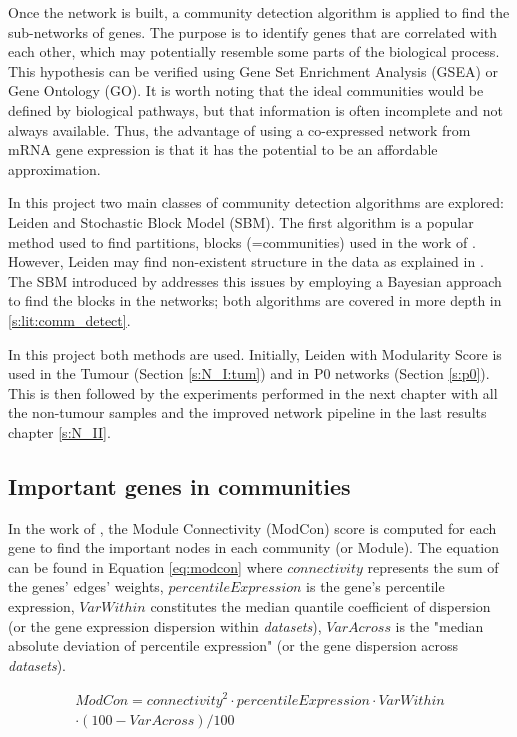 Once the network is built, a community detection algorithm is applied to find the sub-networks of genes. The purpose is to identify genes that are correlated with each other, which may potentially resemble some parts of the biological process. This hypothesis can be verified using Gene Set Enrichment Analysis (GSEA) or Gene Ontology (GO). It is worth noting that the ideal communities would be defined by biological pathways, but that information is often incomplete and not always available. Thus, the advantage of using a co-expressed network from mRNA gene expression is that it has the potential to be an affordable approximation.


In this project two main classes of community detection algorithms are explored: Leiden and Stochastic Block Model (SBM). The first algorithm is a popular method used to find partitions, blocks (=communities) used in the work of \cite{Care2019-ij}. However, Leiden may find non-existent structure in the data as explained in \citet{Peixoto2021-jx}. The SBM introduced by \citet{Peixoto2019-fg} addresses this issues by employing a Bayesian approach to find the blocks in the networks; both algorithms are covered in more depth in \cref{s:lit:comm_detect}.

In this project both methods are used. Initially, Leiden with Modularity Score is used in the Tumour (Section \ref{s:N_I:tum}) and in P0 networks (Section \ref{s:p0}). This is then followed by the experiments performed in the next chapter with all the non-tumour samples and the improved network pipeline in the last results chapter \cref{s:N_II}.

\subsection{Important genes in communities}

In the work of \citet{Care2019-ij}, the  Module Connectivity (ModCon) score is computed for each gene to find the important nodes in each community (or Module). The equation can be found in Equation \ref{eq:modcon} where $connectivity$ represents the sum of the genes' edges' weights, $percentileExpression$ is the gene's percentile expression, $VarWithin$ constitutes the median quantile coefficient of dispersion (or the gene expression dispersion within \textit{datasets}), $VarAcross$ is the "median absolute deviation of percentile expression" (or the gene dispersion across \textit{datasets}).

\begin{multline} \label{eq:modcon}
         ModCon = connectivity^2 \cdot percentileExpression \cdot VarWithin \\
         \cdot (100 - VarAcross) / 100
\end{multline}

